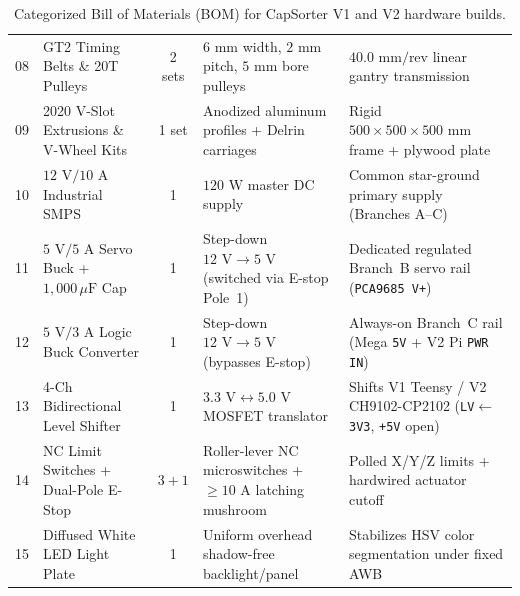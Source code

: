 \documentclass[10pt,twocolumn,letterpaper]{article}
\begin{document}
\begin{table}[h]
{\begin{tabular}{@{}clcll@{}}
    08 & GT2 Timing Belts \& 20T Pulleys & 2 sets & $6\text{ mm}$ width, $2\text{ mm}$ pitch, $5\text{ mm}$ bore pulleys & $40.0\text{ mm/rev}$ linear gantry transmission \\
    09 & 2020 V-Slot Extrusions \& V-Wheel Kits & 1 set & Anodized aluminum profiles + Delrin carriages & Rigid $500{\times}500{\times}500\text{ mm}$ frame + plywood plate \\
    10 & $12\text{ V}/10\text{ A}$ Industrial SMPS & 1 & $120\text{ W}$ master DC supply & Common star-ground primary supply (Branches A--C) \\
    11 & $5\text{ V}/5\text{ A}$ Servo Buck + $1{,}000\,\mu\text{F}$ Cap & 1 & Step-down $12\text{ V}\to 5\text{ V}$ (switched via E-stop Pole~1) & Dedicated regulated Branch~B servo rail (\texttt{PCA9685 V+}) \\
    12 & $5\text{ V}/3\text{ A}$ Logic Buck Converter & 1 & Step-down $12\text{ V}\to 5\text{ V}$ (bypasses E-stop) & Always-on Branch~C rail (Mega \texttt{5V} + V2 Pi \texttt{PWR IN}) \\
    13 & 4-Ch Bidirectional Level Shifter & 1 & $3.3\text{ V}\leftrightarrow 5.0\text{ V}$ MOSFET translator & Shifts V1 Teensy / V2 CH9102-CP2102 (\texttt{LV}$\leftarrow$\texttt{3V3}, \texttt{+5V} open) \\
    14 & NC Limit Switches + Dual-Pole E-Stop & $3+1$ & Roller-lever NC microswitches + $\ge 10\text{ A}$ latching mushroom & Polled X/Y/Z limits + hardwired actuator cutoff \\
    15 & Diffused White LED Light Plate & 1 & Uniform overhead shadow-free backlight/panel & Stabilizes HSV color segmentation under fixed AWB \\
    \bottomrule
  \end{tabular}}
  \caption{Categorized Bill of Materials (BOM) for CapSorter V1 and V2 hardware builds.}
  \label{tab:bom}
\end{table}
\end{document}
